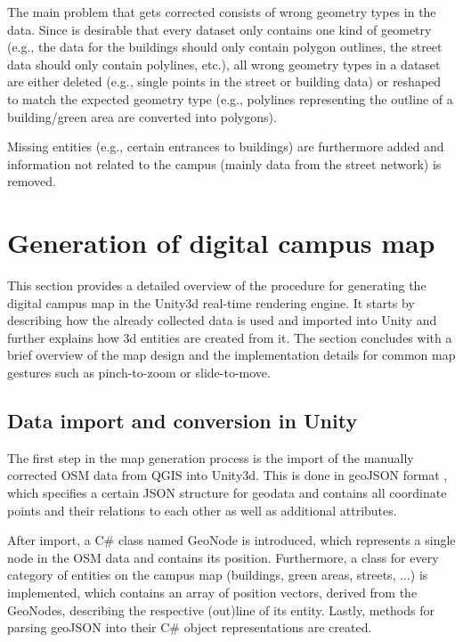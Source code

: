 The main problem that gets corrected consists of wrong geometry types in the data. Since is desirable that every dataset only contains one kind of geometry (e.g., the data for the buildings should only contain polygon outlines, the street data should only contain polylines, etc.), all wrong geometry types in a dataset are either deleted (e.g., single points in the street or building data) or reshaped to match the expected geometry type (e.g., polylines representing the outline of a building/green area are converted into polygons).

Missing entities (e.g., certain entrances to buildings) are furthermore added and information not related to the campus (mainly data from the street network) is removed.

\section{Generation of digital campus map}
This section provides a detailed overview of the procedure for generating the digital campus map in the Unity3d real-time rendering engine. It starts by describing how the already collected data is used and imported into Unity and further explains how 3d entities are created from it. The section concludes with a brief overview of the map design and the implementation details for common map gestures such as pinch-to-zoom or slide-to-move.

\subsection{Data import and conversion in Unity}
The first step in the map generation process is the import of the manually corrected OSM data from QGIS into Unity3d. This is done in geoJSON format \cite{geoJSON}, which specifies a certain JSON structure for geodata and contains all coordinate points and their relations to each other as well as additional attributes.

After import, a C\# class named GeoNode is introduced, which represents a single node in the OSM data and contains its position. Furthermore, a class for every category of entities on the campus map (buildings, green areas, streets, ...) is implemented, which contains an array of position vectors, derived from the GeoNodes, describing the respective (out)line of its entity. Lastly, methods for parsing geoJSON into their C\# object representations are created.

